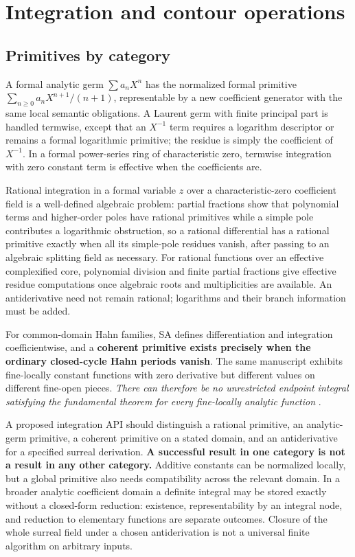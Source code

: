 \documentclass[11pt,letterpaper]{article}
\numberwithin{equation}{section}
\theoremstyle{definition}
\theoremstyle{remark}
\begin{document}
\section{Integration and contour operations}
\label{cas:sec-integration}

\subsection{Primitives by category}
\label{cas:sub-primitives}
A formal analytic germ $\sum a_nX^n$ has the normalized formal primitive
$\sum_{n\ge0}a_nX^{n+1}/(n+1)$, representable by a new coefficient generator
with the same local semantic obligations. A Laurent germ with finite principal
part is handled termwise, except that an $X^{-1}$ term requires a logarithm
descriptor or remains a formal logarithmic primitive; the residue is simply the
coefficient of $X^{-1}$. In a formal power-series ring of characteristic zero,
termwise integration with zero constant term is effective when the coefficients
are.

Rational integration in a formal variable $z$ over a characteristic-zero
coefficient field is a well-defined algebraic problem: partial fractions show
that polynomial terms and higher-order poles have rational primitives while a
simple pole contributes a logarithmic obstruction, so a rational differential
has a rational primitive exactly when all its simple-pole residues vanish, after
passing to an algebraic splitting field as necessary. For rational functions
over an effective complexified core, polynomial division and finite partial
fractions give effective residue computations once algebraic roots and
multiplicities are available. An antiderivative need not remain rational;
logarithms and their branch information must be added.

For common-domain Hahn families, SA defines differentiation and integration
coefficientwise, and a \textbf{coherent primitive exists precisely when the
ordinary closed-cycle Hahn periods vanish}. The same manuscript exhibits
fine-locally constant functions with zero derivative but different values on
different fine-open pieces. \emph{There can therefore be no unrestricted
endpoint integral satisfying the fundamental theorem for every fine-locally
analytic function} \cite{cas:SourceAnalysisThree,cas:SourceCT}.

A proposed integration API should distinguish a rational primitive, an
analytic-germ primitive, a coherent primitive on a stated domain, and an
antiderivative for a specified surreal derivation. \textbf{A successful result
in one category is not a result in any other category.} Additive constants can
be normalized locally, but a global primitive also needs compatibility across
the relevant domain. In a broader analytic coefficient domain a definite
integral may be stored exactly without a closed-form reduction: existence,
representability by an integral node, and reduction to elementary functions are
separate outcomes. Closure of the whole surreal field under a chosen
antiderivation is not a universal finite algorithm on arbitrary inputs.
\end{document}
